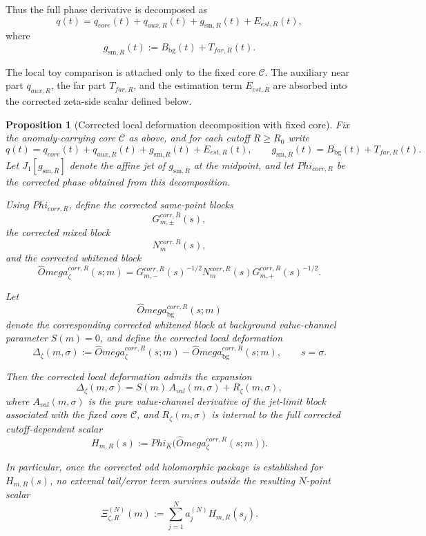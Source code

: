 \documentclass[11pt,a4paper]{amsart}
\def\Omega{Omega}%
\def\Phi{Phi}%
\def\corr{corr}%
\def\val{val}%
\def\far{far}%
\def\est{est}%
\def\core{core}%
\def\aux{aux}%
\theoremstyle{plain}
\newtheorem{proposition}[theorem]{Proposition}
\theoremstyle{definition}
\newcommand{\sm}{\mathrm{sm}}
\newcommand{\far}{\mathrm{far}}
\newcommand{\est}{\mathrm{est}}
\newcommand{\val}{\mathrm{val}}
\newcommand{\corr}{\mathrm{corr}}
\newcommand{\bg}{\mathrm{bg}}
\newcommand{\core}{\mathrm{core}}
\newcommand{\aux}{\mathrm{aux}}
\begin{document}
Thus the full phase derivative is decomposed as
\[
q(t)=q_{\core}(t)+q_{\aux,R}(t)+g_{\sm,R}(t)+E_{\est,R}(t),
\]
where
\[
g_{\sm,R}(t):=B_{\bg}(t)+T_{\far,R}(t).
\]

The local toy comparison is attached only to the fixed core $\mathcal C$. The
auxiliary near part $q_{\aux,R}$, the far part $T_{\far,R}$, and the
estimation term $E_{\est,R}$ are absorbed into the corrected zeta-side scalar
defined below.

\begin{proposition}[Corrected local deformation decomposition with fixed core]
\label{prop:corrected-local-decomposition}
Fix the anomaly-carrying core $\mathcal C$ as above, and for each cutoff
$R\ge R_0$ write
\[
q(t)=q_{\core}(t)+q_{\aux,R}(t)+g_{\sm,R}(t)+E_{\est,R}(t),
\qquad
g_{\sm,R}(t)=B_{\bg}(t)+T_{\far,R}(t).
\]
Let $J_1[g_{\sm,R}]$ denote the affine jet of $g_{\sm,R}$ at the midpoint,
and let $\Phi_{\corr,R}$ be the corrected phase obtained from this
decomposition.

Using $\Phi_{\corr,R}$, define the corrected same-point blocks
\[
G_{m,\pm}^{\corr,R}(s),
\]
the corrected mixed block
\[
N_m^{\corr,R}(s),
\]
and the corrected whitened block
\[
\widehat\Omega_\zeta^{\corr,R}(s;m)
=
G_{m,-}^{\corr,R}(s)^{-1/2}
N_m^{\corr,R}(s)
G_{m,+}^{\corr,R}(s)^{-1/2}.
\]

Let
\[
\widehat\Omega_{\bg}^{\corr,R}(s;m)
\]
denote the corresponding corrected whitened block at background value-channel
parameter $S(m)=0$, and define the corrected local deformation
\[
\Delta_\zeta(m,\sigma)
:=
\widehat\Omega_\zeta^{\corr,R}(s;m)-\widehat\Omega_{\bg}^{\corr,R}(s;m),
\qquad s=\sigma.
\]

Then the corrected local deformation admits the expansion
\[
\boxed{
\Delta_\zeta(m,\sigma)
=
S(m)\,A_{\val}(m,\sigma)+R_\zeta(m,\sigma),
}
\]
where $A_{\val}(m,\sigma)$ is the pure value-channel derivative of the
jet-limit block associated with the fixed core $\mathcal C$, and
$R_\zeta(m,\sigma)$ is internal to the full corrected cutoff-dependent scalar
\[
H_{m,R}(s):=\Phi_K\!\bigl(\widehat\Omega_\zeta^{\corr,R}(s;m)\bigr).
\]

In particular, once the corrected odd holomorphic package is established for
$H_{m,R}(s)$, no external tail/error term survives outside the resulting
$N$-point scalar
\[
\Xi_{\zeta,R}^{(N)}(m)
:=
\sum_{j=1}^N a_j^{(N)}H_{m,R}(s_j).
\]
\end{proposition}
\end{document}
